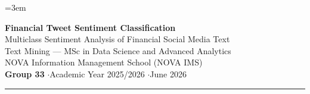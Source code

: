 \documentclass[11pt,a4paper]{article}
\begin{document}
\emergencystretch=3em
\hfuzz=1pt

\thispagestyle{fancy}
\begin{center}
  {\LARGE\bfseries\color{maincolor} Financial Tweet Sentiment Classification}\\[3pt]
  {\large\color{darkgray} Multiclass Sentiment Analysis of Financial Social Media Text}\\[8pt]
  {\normalsize Text Mining --- MSc in Data Science and Advanced Analytics}\\[1pt]
  {\normalsize NOVA Information Management School (NOVA IMS)}\\[5pt]
  {\normalsize \textbf{Group 33} \quad$\cdot$\quad Academic Year 2025/2026 \quad$\cdot$\quad June 2026}
\end{center}
\vspace{2pt}
{\color{maincolor}\rule{\linewidth}{0.6pt}}
\vspace{4pt}

\end{document}
